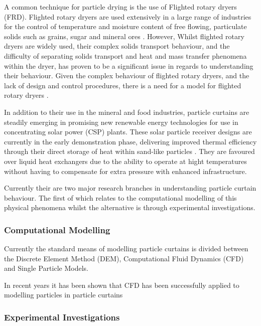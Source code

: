 \documentclass[12pt]{article}
\newcommand{\ts}{\textsuperscript}
\newcommand{\pe}{\vspace{0.3cm}}
\newcommand{\mycite}[1]{\ts{\cite{#1}}}
\begin{document}
\pe 

A common technique for particle drying is the use of Flighted rotary dryers (FRD). Flighted rotary dryers are used extensively in a large range of industries for the control of
temperature and moisture content of free flowing, particulate solids such as grains, sugar and mineral ores \mycite{AndrewLeePhd}. However, Whilst flighted rotary dryers are widely used, their complex solids transport behaviour, and the difficulty of separating solids transport and heat and mass transfer phenomena within the dryer, has proven to be a significant issue in regards to understanding their behaviour. Given the complex behaviour of flighted rotary dryers, and the lack of design and control procedures, there is a need for a model for flighted rotary dryers \mycite{AndrewLeePhd}. 

\pe 

In addition to their use in the mineral and food industries, particle curtains are steadily emerging in promising new renewable energy technologies for use in concentrating solar power (CSP) plants. These solar particle receiver designs are currently in the early demonstration phase, delivering improved thermal efficiency through their direct storage of heat within sand-like particles \ts{\cite{christian2015system, viebahn2011potential}}. They are favoured over liquid heat exchangers due to the ability to operate at hight temperatures without having to compensate for extra pressure with enhanced infrastructure. 

\pe 

Currently their are two major research branches in understanding particle curtain behaviour. The first of which relates to the computational modelling of this physical phenomena whilst the alternative is through experimental investigations.  

\subsubsection{Computational Modelling} 

Currently the standard means of modelling particle curtains is divided between the Discrete Element Method (DEM), Computational Fluid Dynamics (CFD) and Single Particle Models.


 In recent years it has been shown that CFD has been successfully applied to modelling particles in particle curtains 

\subsubsection{Experimental Investigations}
\end{document}
